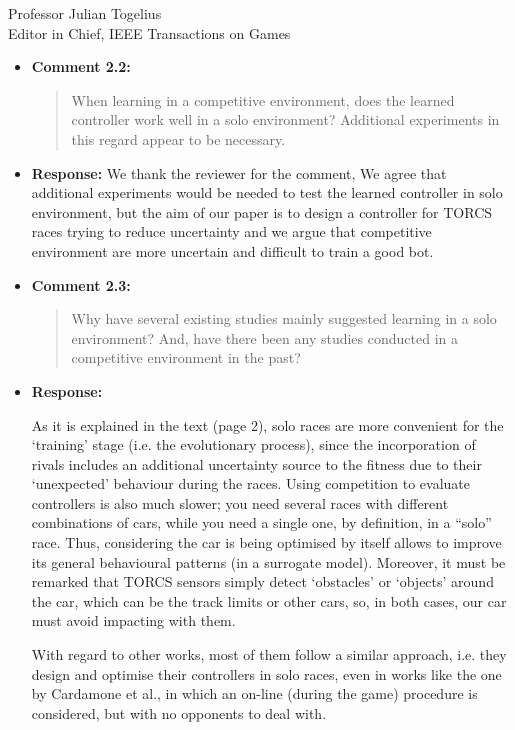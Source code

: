 \documentclass[10pt]{letter} %
\begin{document}
\begin{letter}{Professor Julian Togelius \\ Editor in Chief, IEEE Transactions on Games}
\begin{enumerate}
\begin{itemize}
\begin{itemize}
                        that is indeed a good suggestion for future
                        work, for which we are really grateful. For
                        the time being, that introduction of another
                        variable in the problem was not considered for
                        this paper.
		\item {\bf Comment 2.2:}
		\begin{quote}
When learning in a competitive environment, does the learned controller work well in a solo environment? Additional experiments in this regard appear to be necessary.
			\end{quote}	
		\item {\bf Response:} 
		We thank the reviewer for the comment, We agree that additional experiments would be needed to test the learned controller in solo environment, but the aim of our paper is to design a controller for TORCS races trying to reduce uncertainty and we argue that competitive environment are more uncertain and difficult to train a good bot.
		
		\item {\bf Comment 2.3:}
		\begin{quote}
Why have several existing studies mainly suggested learning in a solo environment? And, have there been any studies conducted in a competitive environment in the past?
			\end{quote}	
		\item {\bf Response:} 

	As it is explained in the text (page 2), solo races are more
        convenient for the `training' stage (i.e. the evolutionary
        process), since the incorporation of rivals includes an
        additional uncertainty source to the fitness due to their `unexpected'
        behaviour during the races. Using competition to evaluate
        controllers is also much slower; you need several races with
        different combinations of cars, while you need a single one,
        by definition, in a ``solo'' race.
        Thus, considering the car is being optimised by itself allows to improve its general behavioural patterns (in a surrogate model). Moreover, it must be remarked that TORCS sensors simply detect `obstacles' or `objects' around the car, which can be the track limits or other cars, so, in both cases, our car must avoid impacting with them.

With regard to other works, most of them follow a similar approach, i.e. they design and optimise their controllers in solo races, even in works like the one by Cardamone et al., in which an on-line (during the game) procedure is considered, but with no opponents to deal with.


\end{itemize}
\end{itemize}
\end{enumerate}
\end{letter}
\end{document}
